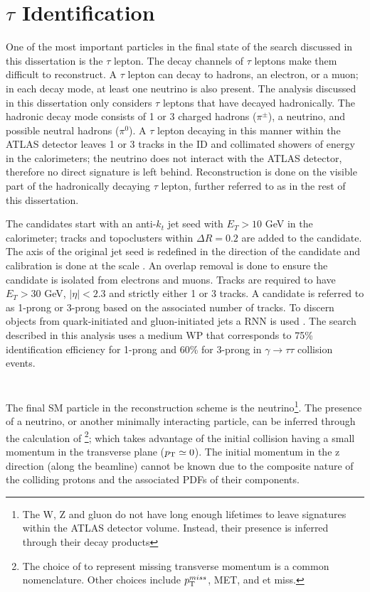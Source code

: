 	\section{$\tau$ Identification}\label{ssec:reco-tau}
		One of the most important particles in the final state of the search discussed in this dissertation is the $\tau$ lepton. The decay channels of $\tau$ leptons make them difficult to reconstruct. A $\tau$ lepton can decay to hadrons, an electron, or a muon; in each decay mode, at least one neutrino is also present. The analysis discussed in this dissertation only considers $\tau$ leptons that have decayed hadronically. The hadronic decay mode consists of 1 or 3 charged hadrons ($\pi^{\pm}$), a neutrino, and possible neutral hadrons ($\pi^0$). A $\tau$ lepton decaying in this manner within the \gls{ATLAS} detector leaves 1 or 3 tracks in the \gls{ID} and collimated showers of energy in the calorimeters; the neutrino does not interact with the \gls{ATLAS} detector, therefore no direct signature is left behind. Reconstruction is done on the visible part of the hadronically decaying $\tau$ lepton, further referred to as \tauhad in the rest of this dissertation. 

		The \tauhad candidates start with an anti-$k_t$ jet seed with $E_T>10$ GeV in the calorimeter; tracks and topoclusters within $\Delta R = 0.2$ are added to the \tauhad candidate. The axis of the original jet seed is redefined in the direction of the \tauhad candidate and calibration is done at the \tauhad scale \cite{tau-id-calib}. An overlap removal is done to ensure the \tauhad candidate is isolated from electrons and muons. Tracks are required to have $E_{T}>30$ GeV, $|\eta|<2.3$ and strictly either 1 or 3 tracks. A \tauhad candidate is referred to as 1-prong or 3-prong based on the associated number of tracks. To discern \tauhad objects from quark-initiated and gluon-initiated jets a \gls{RNN} is used \cite{tau-id-rnn}. The search described in this analysis uses a medium \gls{WP} that corresponds to 75\% identification efficiency for 1-prong and 60\% for 3-prong in $\gamma \to \tau \tau$ collision events.

	\section{\Etm}\label{sec:reco-etmiss}
		The final \acrshort{SM} particle in the reconstruction scheme is the neutrino\footnote{The W, Z and gluon do not have long enough lifetimes to leave signatures within the \gls{ATLAS} detector volume. Instead, their presence is inferred through their decay products}. The presence of a neutrino, or another minimally interacting particle, can be inferred through the calculation of \Etm\footnote{The choice of \Etm to represent missing transverse momentum is a common nomenclature. Other choices include $p_{\text{T}}^{miss}$, MET, and et miss.}; which takes advantage of the initial collision having a small momentum in the transverse plane ($p_{\text{T}} \simeq 0$). The initial momentum in the z direction (along the beamline) cannot be known due to the composite nature of the colliding protons and the associated PDFs of their components.

